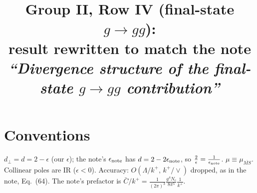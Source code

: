 \documentclass[10pt]{article}
\title{Group II, Row IV (final-state $g\to gg$):\\ result rewritten to match the note
\emph{``Divergence structure of the final-state $g\to gg$ contribution''}}
\author{}
\date{}
\begin{document}
\maketitle
\vspace{-2.5em}

\section*{Conventions}
$d_\perp=d=2-\epsilon$ (our $\epsilon$); the note's $\epsilon_{\rm note}$ has $d=2-2\epsilon_{\rm note}$, so
$\frac{2}{\epsilon}=\frac{1}{\epsilon_{\rm note}}$. $\mu\equiv\mu_{\overline{MS}}$. Collinear poles are IR ($\epsilon<0$).
Accuracy: $O(\Lambda/k^+,\,k^+/\vee)$ dropped, as in the note, Eq.~(64). The note's prefactor
is $\bar C/k^+=\frac{1}{(2\pi)^3}\frac{g^4N_c}{8\pi^5}\frac{1}{k^+}$.
\end{document}
